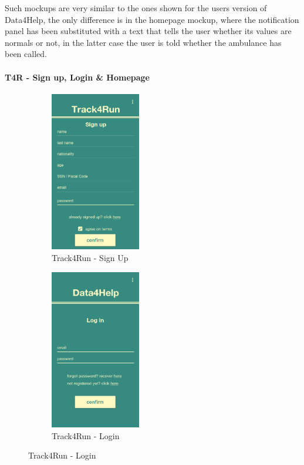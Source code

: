   Such mockups are very similar to the ones shown for the users version of Data4Help, the only difference is in the homepage mockup, where the notification panel has been substituted with a text that tells the user whether its values are normals or not, in the latter case the user is told whether the ambulance has been called.



  \paragraph{T4R - Sign up, Login \& Homepage}
\begin{figure}[H]
\centering
\begin{subfigure}{.33\textwidth}
  \centering
  \includegraphics[width=.9\linewidth, height = 7cm, keepaspectratio]{./Images/Mockups/Track4Run/T4R_SignUp.png}
  \caption{Track4Run - Sign Up}
\end{subfigure}%
\begin{subfigure}{.33\textwidth}
  \centering
  \includegraphics[width = .9\linewidth, height = 7cm, keepaspectratio]{./Images/Mockups/Track4Run/T4R_Login.png}
  \caption{Track4Run - Login}
\end{subfigure}

\end{figure}
